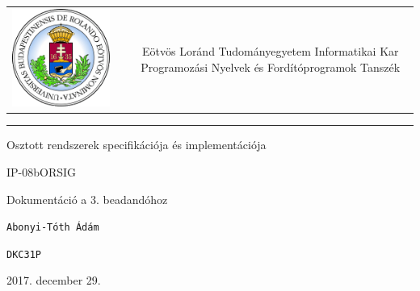 \documentclass[12pt]{article}
\begin{document}
	
	

\begin{titlepage}
	\vspace*{0cm}
	\centering
	\begin{tabular}{cp{1cm}c}
		\begin{minipage}{4cm}
			\vspace{0pt}
			\includegraphics[width=1\textwidth]{elte_cimer}
		\end{minipage} & &
		\begin{minipage}{7cm}
			\vspace{0pt}Eötvös Loránd Tudományegyetem \vspace{10pt} \newline
			Informatikai Kar \vspace{10pt} \newline
			Programozási Nyelvek és Fordítóprogramok Tanszék
		\end{minipage}
	\end{tabular}
	
	\vspace*{0.2cm}
	\rule{\textwidth}{1pt}
	
	\vspace*{3cm}
	{\Huge Osztott rendszerek specifikációja és implementációja }
	
	\vspace*{0.5cm}
	{\normalsize IP-08bORSIG}
	
	\vspace{2cm}
	{\huge Dokumentáció a 3. beadandóhoz}
	
	\vspace*{5cm}
	
	{\large \verb|Abonyi-Tóth Ádám| } %
	
	{\large \verb|DKC31P| }  %
		
	
	\vfill
	
	\vspace*{1cm}
	2017. december 29. %
\end{titlepage}
\end{document}
